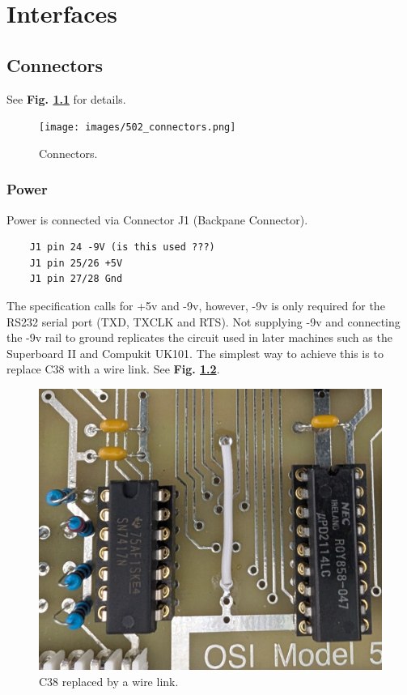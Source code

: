 \chapter{Interfaces}

\section{Connectors}

See \textbf{Fig. \ref{fig:connectors}} for details.

\begin{figure}[htbp]
    \begin{center}
    \texttt{[image: images/502\_connectors.png]}
    \caption{Connectors.}
    \label{fig:connectors}
    \end{center}
    \end{figure}

\subsection{Power}

Power is connected via Connector J1 (Backpane Connector).

\begin{verbatim}
    J1 pin 24 -9V (is this used ???)
    J1 pin 25/26 +5V
    J1 pin 27/28 Gnd
\end{verbatim}

The specification calls for +5v and -9v, however, -9v is only required for the RS232 serial port (TXD, TXCLK and RTS). Not supplying -9v and connecting the -9v rail to ground replicates the circuit used in later machines such as the Superboard II and Compukit UK101. The simplest way to achieve this is to replace C38 with a wire link. See \textbf{Fig. \ref{fig:c38}}.

\begin{figure}[htbp]
    \begin{center}
    \includegraphics[width=4.9in]{images/C38.jpg}
    \caption{C38 replaced by a wire link.}
    \label{fig:c38}
    \end{center}
    \end{figure}


